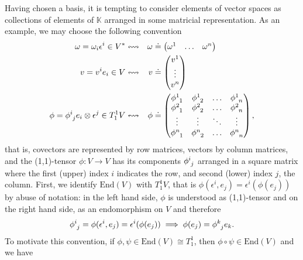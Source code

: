 \begin{remark}
    Having chosen a basis, it is tempting to consider elements of vector spaces as collections of elements of \(\mathbb{K}\) arranged in some matricial representation. As an example, we may choose the following convention
    \begin{equation*}
        \begin{aligned}
            \omega = \omega_i \epsilon^i \in V ^{\ast}& \leftrightsquigarrow & \omega &\doteq \begin{pmatrix}\omega^1 & \dots & \omega^n\end{pmatrix}\\
            v = v^ie_i \in V & \leftrightsquigarrow & v &\doteq \begin{pmatrix}v^1\\\vdots\\v^n\end{pmatrix}\\
            \phi = \phi\indices{^i_j} e_i \otimes \epsilon^j\in T_1^1V & \leftrightsquigarrow & \phi &\doteq \begin{pmatrix}\phi\indices{^1_1}&\phi\indices{^1_2}&\dots&\phi\indices{^1_n}\\\phi\indices{^2_1}&\phi\indices{^2_2}&\dots&\phi\indices{^2_n}\\\vdots&\vdots&\ddots&\vdots\\\phi\indices{^n_1}&\phi\indices{^n_2}&\dots&\phi\indices{^n_n}\\\end{pmatrix},
        \end{aligned}
    \end{equation*}
    that is, covectors are represented by row matrices, vectors by column matrices, and the (1,1)-tensor \(\phi : V \to V\) has its components \(\phi\indices{^i_j}\) arranged in a square matrix where the first (upper) index \(i\) indicates the row, and second (lower) index \(j\), the column. First, we identify \(\mathrm{End}(V)\) with \(T_1^1V\), that is \(\phi(\epsilon^i, e_j) = \epsilon^i(\phi(e_j))\) by abuse of notation: in the left hand side, \(\phi\) is understood as (1,1)-tensor and on the right hand side, as an endomorphism on \(V\) and therefore
    \begin{equation*}
        \phi\indices{^i_j} = \phi(\epsilon^i, e_j) = \epsilon^i(\phi(e_j)) \implies \phi(e_j) = \phi\indices{^k_j}e_k.
    \end{equation*}
    To motivate this convention, if \(\phi, \psi \in \mathrm{End}(V) \cong T_1^1\), then \(\phi \circ \psi \in \mathrm{End}(V)\) and we have

\end{remark}
